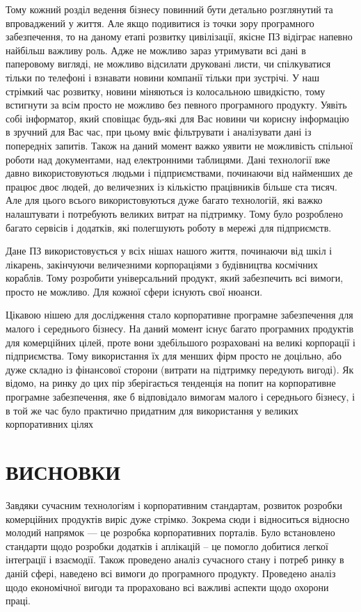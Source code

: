 Тому кожний розділ ведення бізнесу повинний бути детально розглянутий та впроваджений у життя. 
Але якщо подивитися із точки зору програмного забезпечення, то на даному етапі розвитку цивілізації, якісне ПЗ відіграє напевно найбільш важливу роль. 
Адже не можливо зараз утримувати всі дані в паперовому вигляді, не можливо відсилати друковані листи, чи спілкуватися тільки по телефоні і взнавати новини компанії тільки при зустрічі. 
У наш стрімкий час розвитку, новини міняються із колосальною швидкістю, тому встигнути за всім просто не можливо без певного програмного продукту. 
Уявіть собі інформатор, який сповіщає будь-які для Вас новини чи корисну інформацію в зручний для Вас час, при цьому вміє фільтрувати і аналізувати дані із попередніх запитів. 
Також на даний момент важко уявити не можливість спільної роботи над документами, над електронними таблицями. 
Дані технології вже давно використовуються людьми і підприємствами, починаючи від найменших де працює двоє людей, до величезних із кількістю працівників більше ста тисяч. 
Але для цього всього використовуються дуже багато технологій, які важко налаштувати і потребують великих витрат на підтримку.
Тому було розроблено багато сервісів і додатків, які полегшують роботу в мережі для підприємств.
\par Дане ПЗ використовується у всіх нішах нашого життя, починаючи від шкіл і лікарень, закінчуючи величезними корпораціями з будівництва космічних кораблів. 
Тому розробити універсальний продукт, який забезпечить всі вимоги, просто не можливо. 
Для кожної сфери існують свої нюанси.
\par Цікавою нішею для дослідження стало корпоративне програмне забезпечення для малого і середнього бізнесу.
 На даний момент існує багато програмних продуктів для комерційних цілей, проте вони здебільшого розраховані на великі корпорації і підприємства.
Тому використання їх для менших фірм просто не доцільно, або дуже складно із фінансової сторони (витрати на підтримку передують вигоді).
Як відомо, на ринку до цих пір зберігається тенденція на попит на корпоративне програмне забезпечення, яке б відповідало вимогам малого і середнього бізнесу, і в той же час було практично придатним для використання у великих корпоративних цілях









\section*{ВИСНОВКИ}
Завдяки сучасним технологіям і корпоративним стандартам, розвиток розробки комерційних продуктів виріс дуже стрімко. 
Зокрема сюди і відноситься відносно молодий напрямок --- це розробка корпоративних порталів. 
Було встановлено стандарти щодо розробки додатків і аплікацій -- це помогло добитися легкої інтеграції і взаємодії. 
Також проведено аналіз сучасного стану і потреб ринку в даній сфері, наведено всі вимоги до програмного продукту.
Проведено аналіз щодо економічної вигоди та прораховано всі важливі аспекти щодо охорони праці.



